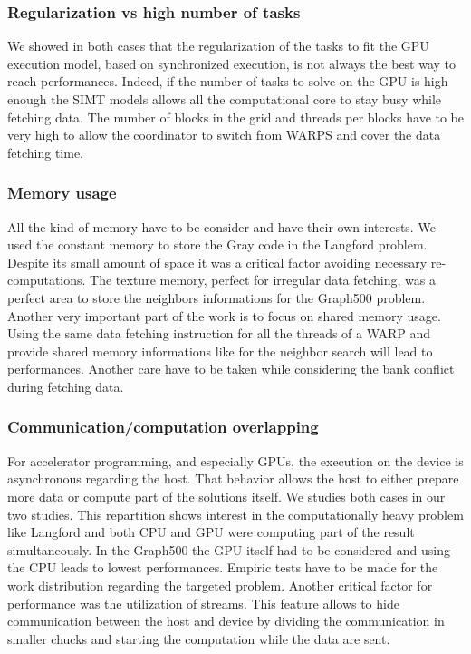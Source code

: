 \subsubsection{Regularization vs high number of tasks}
We showed in both cases that the regularization of the tasks to fit the GPU execution model, based on synchronized execution, is not always the best way to reach performances.
Indeed, if the number of tasks to solve on the GPU is high enough the SIMT models allows all the computational core to stay busy while fetching data. 
The number of blocks in the grid and threads per blocks have to be very high to allow the coordinator to switch from WARPS and cover the data fetching time.
\subsubsection{Memory usage}
All the kind of memory have to be consider and have their own interests. 
We used the constant memory to store the Gray code in the Langford problem.
Despite its small amount of space it was a critical factor avoiding necessary re-computations.
The texture memory, perfect for irregular data fetching, was a perfect area to store the neighbors informations for the Graph500 problem.
Another very important part of the work is to focus on shared memory usage. 
Using the same data fetching instruction for all the threads of a WARP and provide shared memory informations like for the neighbor search will lead to performances. 
Another care have to be taken while considering the bank conflict during fetching data. 
\subsubsection{Communication/computation overlapping}
For accelerator programming, and especially GPUs, the execution on the device is asynchronous regarding the host. 
That behavior allows the host to either prepare more data or compute part of the solutions itself. 
We studies both cases in our two studies. 
This repartition shows interest in the computationally heavy problem like Langford and both CPU and GPU were computing part of the result simultaneously. 
In the Graph500 the GPU itself had to be considered and using the CPU leads to lowest performances. 
Empiric tests have to be made for the work distribution regarding the targeted problem. 
Another critical factor for performance was the utilization of streams. 
This feature allows to hide communication between the host and device by dividing the communication in smaller chucks and starting the computation while the data are sent. 

